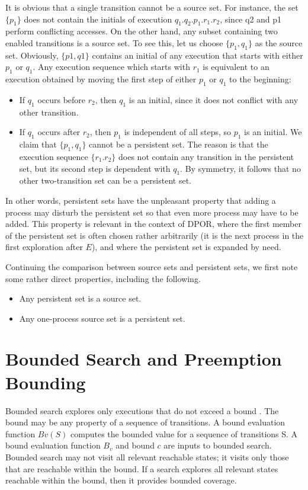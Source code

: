 It is obvious that a single transition cannot be a source set. For
instance, the set $\{ p_1 \}$ does not contain the initials of execution $q_1.q_2.p_1.r_1.r_2$,
since q2 and p1 perform conflicting accesses. On the other hand, any subset
containing two enabled transitions is a source set. To see this, let us choose
$\{p_1, q_1 \}$ as the source set. Obviously, $\{p1, q1 \}$ contains an initial of any execution
that starts with either $p_1$ or $q_1$. Any execution sequence which starts with $r_1$ is
equivalent to an execution obtained by moving the first step of either $p_1$ or $q_1$ to
the beginning:
\begin{itemize}
\item If $q_1$ occurs before $r_2$, then $q_1$ is an initial, since it does not conflict with
any other transition.
\item If $q_1$ occurs after $r_2$, then $p_1$ is independent of all steps, so $p_1$ is an initial.
We claim that $\{p_1, q_1 \}$ cannot be a persistent set. The reason is that the execution
sequence $\{r_1.r_2 \}$ does not contain any transition in the persistent set, but its second
step is dependent with $q_1$. By symmetry, it follows that no other two-transition
set can be a persistent set.
\end{itemize}

In other words, persistent sets have the unpleasant property that adding a process
may disturb the persistent set so that even more process may have to be added.
This property is relevant in the context of DPOR, where the first member of the
persistent set is often chosen rather arbitrarily (it is the next process in the first
exploration after $E$), and where the persistent set is expanded by need.

Continuing the comparison between source sets and persistent sets, we first
note some rather direct properties, including the following.

\begin{itemize}
\item Any persistent set is a source set.
\item Any one-process source set is a persistent set.
\end{itemize}


\section{Bounded Search and Preemption Bounding}

Bounded search explores only executions that do not exceed
a bound \cite{BPOR,Thomson}. The bound may be any property of a
sequence of transitions. A bound evaluation function $Bv(S)$
computes the bounded value for a sequence of transitions S.
A bound evaluation function $B_v$ and bound $c$ are inputs to
bounded search. Bounded search may not visit all relevant
reachable states; it visits only those that are reachable within
the bound. If a search explores all relevant states reachable
within the bound, then it provides bounded coverage.

